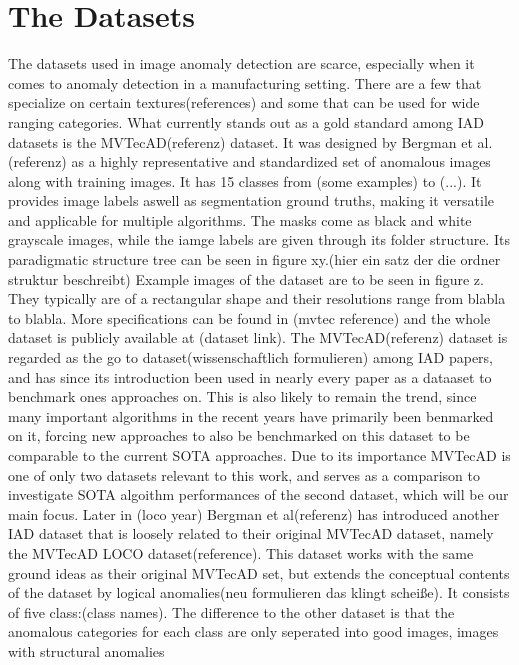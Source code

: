 \section{The Datasets}
The datasets used in image anomaly detection are scarce, especially when it comes to anomaly detection in a manufacturing setting. There are a few that specialize on certain textures(references) 
and some that can be used for wide ranging categories. What currently stands out as a gold standard among IAD datasets is the MVTecAD(referenz) dataset. It was designed by Bergman et al.(referenz) 
as a highly representative and standardized set of anomalous images along with training images. It has 15 classes from (some examples) to (...). It provides image labels aswell as segmentation 
ground truths, making it versatile and applicable for multiple algorithms. The masks come as black and white grayscale images, while the iamge labels are given through its folder structure. 
Its paradigmatic structure tree can be seen in figure xy.(hier ein satz der die ordner struktur beschreibt) Example images of the dataset are to be seen in figure z. They typically are of a rectangular shape and their resolutions range from 
blabla to blabla. More specifications can be found in (mvtec reference) and the whole dataset is publicly available at (dataset link).\newline
The MVTecAD(referenz) dataset is regarded as the go to dataset(wissenschaftlich formulieren) among IAD papers, and has since its introduction been used in nearly every paper as a dataaset 
to benchmark ones approaches on. This is also likely to remain the trend, since many important algorithms in the recent years have primarily been benmarked on it, forcing new approaches 
to also be benchmarked on this dataset to be comparable to the current SOTA approaches. Due to its importance MVTecAD is one of only two datasets relevant to this work, and serves as a 
comparison to investigate SOTA algoithm performances of the second dataset, which will be our main focus.
\newline
Later in (loco year) Bergman et al(referenz) has introduced another IAD dataset that is loosely related to their original MVTecAD dataset, namely the MVTecAD LOCO dataset(reference). 
This dataset works with the same ground ideas as their original MVTecAD set, but extends the conceptual contents of the dataset by logical anomalies(neu formulieren das klingt scheiße). 
It consists of five class:(class names). The difference to the other dataset is that the anomalous categories for each class are only seperated into good images, images with structural anomalies 
